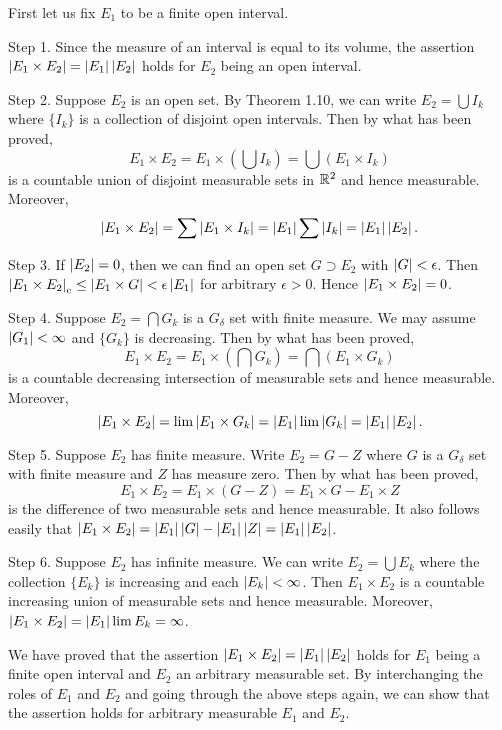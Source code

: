 \begin{exercise}{3.12}
  First let us fix $E_1$ to be a finite open interval.

  Step 1.
  Since the measure of an interval is equal to its volume,
  the assertion $\left\vert E_1 \times E_2\right\vert = \left\vert E_1\right\vert \left\vert E_2\right\vert$ holds
  for $E_2$ being an open interval.

  Step 2.
  Suppose $E_2$ is an open set.
  By Theorem 1.10,
  we can write $E_2 = \bigcup I_k$
  where $\{I_k\}$ is a collection of disjoint open intervals.
  Then by what has been proved,
  \[
    E_1 \times E_2 = E_1 \times \left( \bigcup I_k \right)
    = \bigcup \left(E_1 \times I_k\right)
  \]
  is a countable union of disjoint measurable sets in $\mathbb{R}^2$
  and hence measurable.
  Moreover,
  \[
    \left\vert E_1 \times E_2\right\vert = \sum \left\vert E_1 \times I_k\right\vert
    = \left\vert E_1\right\vert \sum \left\vert I_k\right\vert = \left\vert E_1\right\vert \left\vert E_2\right\vert.
  \]

  Step 3. If $\left\vert E_2\right\vert = 0$, then we can find an open set $G \supset E_2$
  with $\left\vert G\right\vert < \epsilon$. Then
  $\left\vert E_1 \times E_2\right\vert_\mathrm{e} \le \left\vert E_1 \times G\right\vert < \epsilon \left\vert E_1\right\vert$
  for arbitrary $\epsilon > 0$.
  Hence $\left\vert E_1 \times E_2\right\vert = 0$.

  Step 4. Suppose $E_2 = \bigcap G_k$ is a $G_\delta$ set with finite measure.
  We may assume $\left\vert G_1\right\vert < \infty$ and $\{G_k\}$ is decreasing.
  Then by what has been proved,
  \[
    E_1 \times E_2 = E_1 \times \left( \bigcap G_k \right)
    = \bigcap \left( E_1 \times G_k \right)
  \]
  is a countable decreasing intersection of measurable sets
  and hence measurable.
  Moreover,
  \[
    \left\vert E_1 \times E_2\right\vert
    = \lim \left\vert E_1 \times G_k\right\vert
    = \left\vert E_1\right\vert \lim \left\vert G_k\right\vert = \left\vert E_1\right\vert \left\vert E_2\right\vert.
  \]

  Step 5. Suppose $E_2$ has finite measure.
  Write $E_2 = G - Z$ where $G$ is a $G_{\delta}$ set with finite measure
  and $Z$ has measure zero. Then by what has been proved,
  \[
    E_1 \times E_2 = E_1 \times \left( G-Z \right)
    = E_1 \times G - E_1 \times Z
  \]
  is the difference of two measurable sets and hence measurable.
  It also follows easily that
  $\left\vert E_1 \times E_2\right\vert = \left\vert E_1\right\vert\left\vert G\right\vert - \left\vert E_1\right\vert\left\vert Z\right\vert = \left\vert E_1\right\vert\left\vert E_2\right\vert$.

  Step 6. Suppose $E_2$ has infinite measure.
  We can write $E_2 = \bigcup E_k$
  where the collection $\{E_k\}$ is increasing and each $\left\vert E_k\right\vert < \infty$.
  Then $E_1 \times E_2$ is a countable increasing union of measurable sets
  and hence measurable.
  Moreover, $\left\vert E_1 \times E_2\right\vert = \left\vert E_1\right\vert \lim {E_k} = \infty$.

  We have proved that the assertion $\left\vert E_1 \times E_2\right\vert = \left\vert E_1\right\vert \left\vert E_2\right\vert$
  holds for $E_1$ being a finite open interval and $E_2$ an arbitrary measurable set.
  By interchanging the roles of $E_1$ and $E_2$
  and going through the above steps again,
  we can show that the assertion holds for arbitrary measurable $E_1$ and $E_2$.
\end{exercise}

